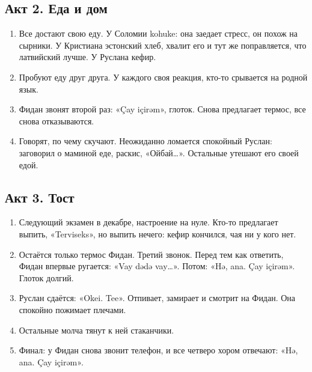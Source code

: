 \documentclass[12pt,a4paper]{article}
\begin{document}
\subsection*{Акт 2. Еда и дом}
\begin{enumerate}[leftmargin=*]
\item Все достают свою еду. У Соломии kohuke: она заедает стресс, он похож на сырники. У Кристиана эстонский хлеб, хвалит его и тут же поправляется, что латвийский лучше. У Руслана кефир.
\item Пробуют еду друг друга. У каждого своя реакция, кто-то срывается на родной язык.
\item Фидан звонят второй раз: «Çay içirəm», глоток. Снова предлагает термос, все снова отказываются.
\item Говорят, по чему скучают. Неожиданно ломается спокойный Руслан: заговорил о маминой еде, раскис, «Ойбай…». Остальные утешают его своей едой.
\end{enumerate}

\subsection*{Акт 3. Тост}
\begin{enumerate}[leftmargin=*]
\item Следующий экзамен в декабре, настроение на нуле. Кто-то предлагает выпить, «Terviseks», но выпить нечего: кефир кончился, чая ни у кого нет.
\item Остаётся только термос Фидан. Третий звонок. Перед тем как ответить, Фидан впервые ругается: «Vay dədə vay…». Потом: «Hə, ana. Çay içirəm». Глоток долгий.
\item Руслан сдаётся: «Okei. Tee». Отпивает, замирает и смотрит на Фидан. Она спокойно пожимает плечами.
\item Остальные молча тянут к ней стаканчики.
\item Финал: у Фидан снова звонит телефон, и все четверо хором отвечают: «Hə, ana. Çay içirəm».
\end{enumerate}
\end{document}
